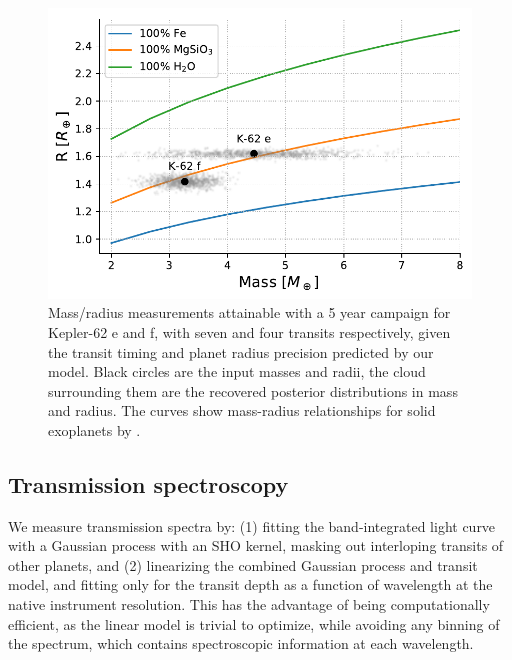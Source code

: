 \begin{figure}
\centering
\includegraphics[scale=0.6]{libra/bulk_densities.pdf}
\caption{Mass/radius measurements attainable with a 5 year campaign for Kepler-62 e and f, with seven and four transits respectively, given the transit timing and planet radius precision predicted by our model. Black circles are the input masses and radii, the cloud surrounding them are the recovered posterior distributions in mass and radius. The curves show mass-radius relationships for solid exoplanets by \citet{Seager2007}. }
\label{fig:bulkdensity}
\end{figure}

\subsection{Transmission spectroscopy} \label{sec:transspec}

We measure transmission spectra by: (1) fitting the band-integrated light curve with a Gaussian process with an SHO kernel, masking out interloping transits of other planets, and (2) linearizing the combined Gaussian process and transit model, and fitting only for the transit depth as a function of wavelength at the native instrument resolution. This has the advantage of being computationally efficient, as the linear model is trivial to optimize, while avoiding any binning of the spectrum, which contains spectroscopic information at each wavelength.

